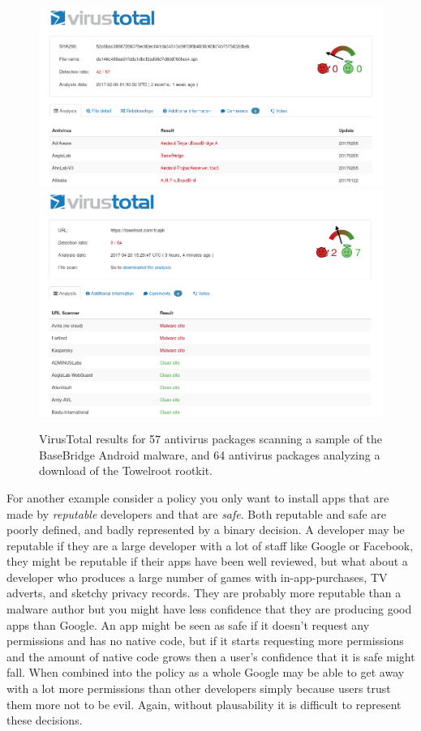 \documentclass[thesis.tex]{subfiles}
\begin{document}
\begin{figure}
  \centering
  \includegraphics[width=\linewidth]{figures/android-malware.png}
  \includegraphics[width=\linewidth]{figures/towelroot.png}
  \caption[VirusTotal results for two Android apps.]{VirusTotal results for 57 antivirus packages scanning a sample of the BaseBridge Android malware, and 64 antivirus packages analyzing a download of the Towelroot rootkit.}
  \label{fig:android-malware}
\end{figure}

For another example consider a policy you only want to install apps
that are made by \emph{reputable} developers and that are \emph{safe}.
Both reputable and safe are poorly defined, and badly represented by a
binary decision.  A developer may be reputable if they are a large
developer with a lot of staff like Google or Facebook, they might be
reputable if their apps have been well reviewed, but what about a
developer who produces a large number of games with
in-app-purchases, TV adverts, and sketchy privacy records.  They are
probably more reputable than a malware author but you might have less
confidence that they are producing good apps than Google.
An app might be seen as safe if it doesn't request any permissions and
has no native code, but if it starts requesting more permissions and
the amount of native code grows then a user's confidence that it is safe
might fall.  When combined into the policy as a whole Google may be
able to get away with a lot more permissions than other developers
simply because users trust them more not to be evil.  Again, without
plausability it is difficult to represent these decisions.
\end{document}
